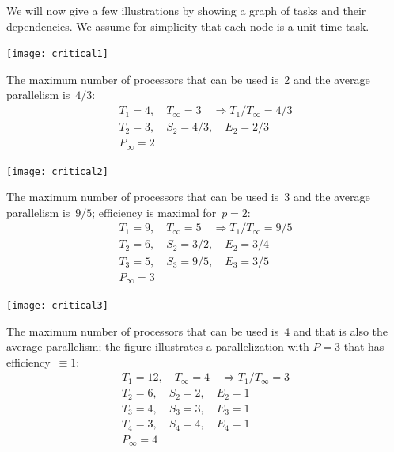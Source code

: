 We will now give a few illustrations by showing a graph of tasks and their dependencies.
We assume for simplicity that each node is a unit time task.

\begin{minipage}{\textwidth}
  \begin{minipage}{.25\textwidth}
    \texttt{[image: critical1]}
  \end{minipage}
  \begin{minipage}{.75\textwidth}
    The maximum number of processors that can be used is~2 and the
    average parallelism is~$4/3$:
    \[
    \begin{array}{l}
      T_1=4,\quad T_\infty=3 \quad\Rightarrow T_1/T_\infty=4/3\\
      T_2=3,\quad S_2=4/3,\quad E_2=2/3\\
      P_\infty=2
    \end{array}
    \]
  \end{minipage}
\end{minipage}

\begin{minipage}{\textwidth}
  \begin{minipage}{.25\textwidth}
    \texttt{[image: critical2]}
  \end{minipage}
  \begin{minipage}{.75\textwidth}
    The maximum number of processors that can be used is~3 and the
    average parallelism is~$9/5$; efficiency is maximal for~$p=2$:
    \[
    \begin{array}{l}
      T_1=9,\quad T_\infty=5 \quad\Rightarrow T_1/T_\infty=9/5\\
      T_2=6,\quad S_2=3/2,\quad E_2=3/4\\
      T_3=5,\quad S_3=9/5,\quad E_3=3/5\\
      P_\infty=3
    \end{array}
    \]
  \end{minipage}
\end{minipage}

\begin{minipage}{\textwidth}
  \begin{minipage}{.4\textwidth}
    \texttt{[image: critical3]}
  \end{minipage}
  \begin{minipage}{.6\textwidth}
    The maximum number of processors that can be used is~4
    and that is also the average parallelism;
    the figure illustrates a parallelization with $P=3$ that
    has efficiency~$\equiv1$:
    \[
    \begin{array}{l}
      T_1=12,\quad T_\infty=4 \quad\Rightarrow T_1/T_\infty=3\\
      T_2=6,\quad S_2=2,\quad E_2=1\\
      T_3=4,\quad S_3=3,\quad E_3=1\\
      T_4=3,\quad S_4=4,\quad E_4=1\\
      P_\infty=4
    \end{array}
    \]
  \end{minipage}
\end{minipage}

